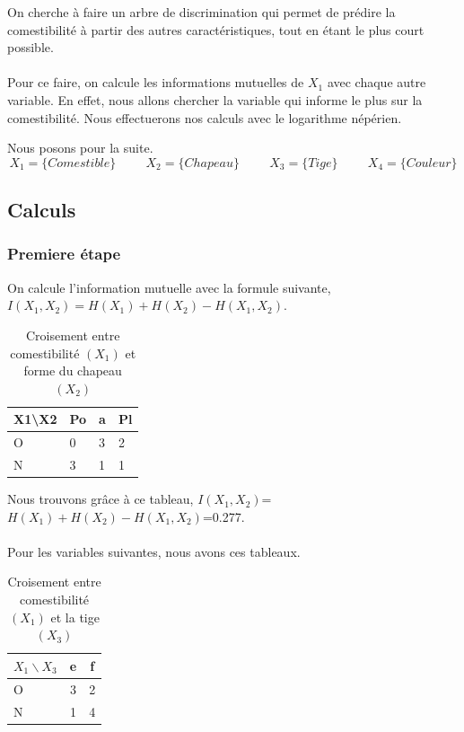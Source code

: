\documentclass{article}
\begin{document}
  On cherche à faire un arbre de discrimination qui permet de prédire la comestibilité à partir des autres caractéristiques, tout en étant le plus court possible.
  \\
  \\
  Pour ce faire, on calcule les informations mutuelles de $X_1$ avec chaque autre variable.
  En effet, nous allons chercher la variable qui informe le plus sur la comestibilité. Nous effectuerons nos calculs avec le logarithme népérien.

Nous posons pour la suite.
\[
X_1 = \{Comestible\} \hspace{1cm} X_2 = \{Chapeau\} \hspace{1cm} X_3 = \{Tige\} \hspace{1cm} X_4 = \{Couleur\}
\]

\subsection{Calculs}

\subsubsection{Premiere étape}
On calcule l'information mutuelle avec la formule suivante, $I(X_1,X_2) = H(X_1) + H(X_2) - H(X_1,X_2)$.

\begin{table}[H]
  \centering
    \caption{Croisement entre comestibilité $(X_1)$ et forme du chapeau $(X_2)$}
    \begin{tabular}{|l|l|l|l|}
    \hline
    X1\textbackslash{}X2 & Po & a & Pl \\ \hline
    O                    & 0  & 3 & 2  \\ \hline
    N                    & 3  & 1 & 1  \\ \hline
    \end{tabular}
\end{table}
Nous trouvons grâce à ce tableau, $I(X_1,X_2)$=$H(X_1)+H(X_2)-H(X_1,X_2)$=0.277.
\\\\
Pour les variables suivantes, nous avons ces tableaux.

\begin{table}[H]
  \centering
    \caption{Croisement entre comestibilité $(X_1)$ et la tige $(X_3)$}
    \begin{tabular}{|l|c|c|}
    \hline
    $X_1 \backslash X_3$ & e & f \\ \hline
    O                    & 3  & 2  \\ \hline
    N                    & 1  & 4  \\ \hline
    \end{tabular}
\end{table}
\end{document}
